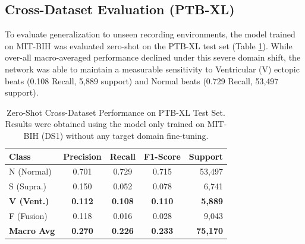 \documentclass[pdflatex,sn-mathphys-num]{sn-jnl}
\theoremstyle{thmstyleone}
\theoremstyle{thmstyletwo}
\theoremstyle{thmstylethree}
\begin{document}
\subsection{Cross-Dataset Evaluation (PTB-XL)}
To evaluate generalization to unseen recording environments, the model trained on MIT-BIH was evaluated zero-shot on the PTB-XL test set (Table \ref{tab:ptbxl_zero_shot}). While over-all macro-averaged performance declined under this severe domain shift, the network was able to maintain a measurable sensitivity to Ventricular (V) ectopic beats (0.108 Recall, 5,889 support) and Normal beats (0.729 Recall, 53,497 support).

\begin{table}[ht]
\caption{Zero-Shot Cross-Dataset Performance on PTB-XL Test Set. Results were obtained using the model only trained on MIT-BIH (DS1) without any target domain fine-tuning.}
\label{tab:ptbxl_zero_shot}
\centering
\footnotesize
\begin{tabular}{@{}l c c c r@{}}
\toprule
\textbf{Class} & \textbf{Precision} & \textbf{Recall} & \textbf{F1-Score} & \textbf{Support} \\ \midrule
N (Normal) & 0.701 & 0.729 & 0.715 & 53,497 \\
S (Supra.) & 0.150 & 0.052 & 0.078 & 6,741 \\
\textbf{V (Vent.)} & \textbf{0.112} & \textbf{0.108} & \textbf{0.110} & \textbf{5,889} \\
F (Fusion) & 0.118 & 0.016 & 0.028 & 9,043 \\ \midrule
\textbf{Macro Avg} & \textbf{0.270} & \textbf{0.226} & \textbf{0.233} & \textbf{75,170} \\ \bottomrule
\end{tabular}
\end{table}
\end{document}
